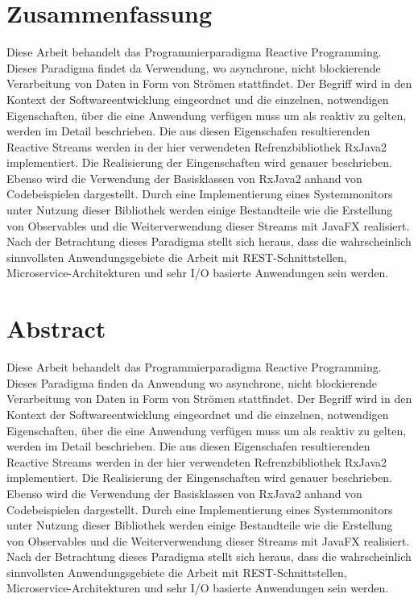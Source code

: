 \pagestyle{empty} %


\section*{Zusammenfassung} %
\label{cha:zusammenfassung}
Diese Arbeit behandelt das Programmierparadigma Reactive Programming. Dieses Paradigma findet da Verwendung, wo asynchrone, nicht blockierende Verarbeitung von Daten in Form von Strömen stattfindet. Der Begriff wird in den Kontext der Softwareentwicklung eingeordnet und die einzelnen, notwendigen Eigenschaften, über die eine Anwendung verfügen muss um als reaktiv zu gelten, werden im Detail beschrieben. Die aus diesen Eigenschafen resultierenden Reactive Streams werden in der hier verwendeten Refrenzbibliothek RxJava2 implementiert. Die Realisierung der Eingenschaften wird genauer beschrieben. Ebenso wird die Verwendung der Basisklassen von RxJava2 anhand von Codebeispielen dargestellt. Durch eine Implementierung eines Systemmonitors unter Nutzung dieser Bibliothek werden einige Bestandteile wie die Erstellung von Observables und die Weiterverwendung dieser Streams mit JavaFX realisiert. Nach der Betrachtung dieses Paradigma stellt sich heraus, dass die wahrscheinlich sinnvollsten Anwendungsgebiete die Arbeit mit REST-Schnittstellen, Microservice-Architekturen und sehr I/O basierte Anwendungen sein werden. 

\vspace*{3cm}
\section*{Abstract} %
\label{cha:abtract}
Diese Arbeit behandelt das Programmierparadigma Reactive Programming. Dieses Paradigma finden da Anwendung wo asynchrone, nicht blockierende Verarbeitung von Daten in Form von Strömen stattfindet. Der Begriff wird in den Kontext der Softwareentwicklung eingeordnet und die einzelnen, notwendigen Eigenschaften, über die eine Anwendung verfügen muss um als reaktiv zu gelten, werden im Detail beschrieben. Die aus diesen Eigenschafen resultierenden Reactive Streams werden in der hier verwendeten Refrenzbibliothek RxJava2 implementiert. Die Realisierung der Eingenschaften wird genauer beschrieben. Ebenso wird die Verwendung der Basisklassen von RxJava2 anhand von Codebeispielen dargestellt. Durch eine Implementierung eines Systemmonitors unter Nutzung dieser Bibliothek werden einige Bestandteile wie die Erstellung von Observables und die Weiterverwendung dieser Streams mit JavaFX realisiert. Nach der Betrachtung dieses Paradigma stellt sich heraus, dass die wahrscheinlich sinnvollsten Anwendungsgebiete die Arbeit mit REST-Schnittstellen, Microservice-Architekturen und sehr I/O basierte Anwendungen sein werden. 

